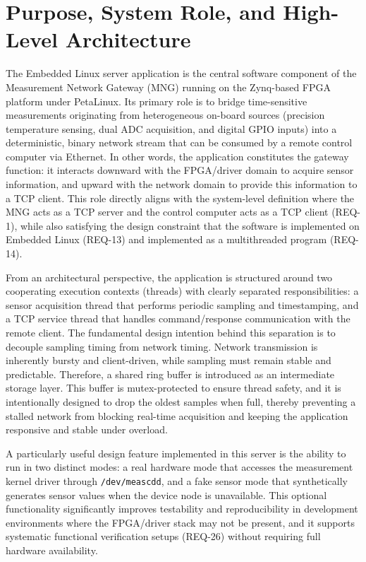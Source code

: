 \section{Purpose, System Role, and High-Level Architecture}
\label{sec:purpose}

The Embedded Linux server application is the central software component of the Measurement Network Gateway (MNG) running on the Zynq-based FPGA platform under PetaLinux. Its primary role is to bridge time-sensitive measurements originating from heterogeneous on-board sources (precision temperature sensing, dual ADC acquisition, and digital GPIO inputs) into a deterministic, binary network stream that can be consumed by a remote control computer via Ethernet. In other words, the application constitutes the gateway function: it interacts downward with the FPGA/driver domain to acquire sensor information, and upward with the network domain to provide this information to a TCP client. This role directly aligns with the system-level definition where the MNG acts as a TCP server and the control computer acts as a TCP client (REQ-1), while also satisfying the design constraint that the software is implemented on Embedded Linux (REQ-13) and implemented as a multithreaded program (REQ-14).

From an architectural perspective, the application is structured around two cooperating execution contexts (threads) with clearly separated responsibilities: a sensor acquisition thread that performs periodic sampling and timestamping, and a TCP service thread that handles command/response communication with the remote client. The fundamental design intention behind this separation is to decouple sampling timing from network timing. Network transmission is inherently bursty and client-driven, while sampling must remain stable and predictable. Therefore, a shared ring buffer is introduced as an intermediate storage layer. This buffer is mutex-protected to ensure thread safety, and it is intentionally designed to drop the oldest samples when full, thereby preventing a stalled network from blocking real-time acquisition and keeping the application responsive and stable under overload.

A particularly useful design feature implemented in this server is the ability to run in two distinct modes: a real hardware mode that accesses the measurement kernel driver through \texttt{/dev/meascdd}, and a fake sensor mode that synthetically generates sensor values when the device node is unavailable. This optional functionality significantly improves testability and reproducibility in development environments where the FPGA/driver stack may not be present, and it supports systematic functional verification setups (REQ-26) without requiring full hardware availability.

